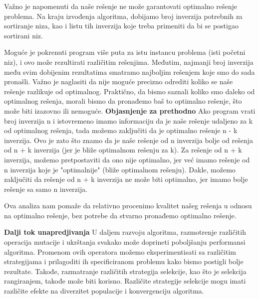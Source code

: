 \documentclass{article}
\begin{document}
Važno je napomenuti da naše rešenje ne može garantovati optimalno rešenje problema. Na kraju izvođenja algoritma, dobijamo broj inverzija potrebnih za sortiranje niza, kao i listu tih inverzija koje treba primeniti da bi se postigao sortirani niz.
\newline

Moguće je pokrenuti program više puta za istu instancu problema (isti početni niz), i ovo može rezultirati različitim rešenjima. Međutim, najmanji broj inverzija među svim dobijenim rezultatima smatramo najboljim rešenjem koje smo do sada pronašli.
\newline
Važno je naglasiti da nije moguće precizno odrediti koliko se naše rešenje razlikuje od optimalnog. Praktično, da bismo saznali koliko smo daleko od optimalnog rešenja, morali bismo da pronađemo baš to optimalno rešenje, što može biti izazovno ili nemoguće.
\newline
\newline
\textbf{Objasnjenje za prethodno}
Ako program vrati broj inverzija n i istovremeno imamo informaciju da je naše rešenje udaljeno za k od optimalnog rešenja, tada možemo zaključiti da je optimalno rešenje n - k inverzija. Ovo je zato što znamo da je naše rešenje od n inverzija bolje od rešenja od n + k inverzija (jer je bliže optimalnom rešenju za k).
\newline
\newline
Za rešenje od n + k inverzija, možemo pretpostaviti da ono nije optimalno, jer već imamo rešenje od n inverzija koje je "optimalnije" (bliže optimalnom rešenju). Dakle, možemo zaključiti da rešenje od n + k inverzija ne može biti optimalno, jer imamo bolje rešenje sa samo n inverzija.
\newline

Ova analiza nam pomaže da relativno procenimo kvalitet našeg rešenja u odnosu na optimalno rešenje, bez potrebe da stvarno pronađemo optimalno rešenje.
\newpage

\textbf{Dalji tok unapredjivanja}
U daljem razvoju algoritma, razmotrenje različitih operacija mutacije i ukrštanja svakako može doprineti poboljšanju performansi algoritma. Promenom ovih operatora možemo eksperimentisati sa različitim strategijama i prilagoditi ih specificiranom problemu kako bismo postigli bolje rezultate.
\newline
Takođe, razmatranje različitih strategija selekcije, kao što je selekcija rangiranjem, takođe može biti korisno. Različite strategije selekcije mogu imati različite efekte na diverzitet populacije i konvergenciju algoritma.
\newline
\end{document}
